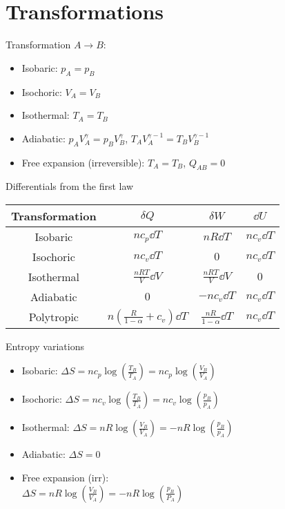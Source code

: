\documentclass{aa}
\begin{document}
\section{Transformations}
Transformation $A\to B$:
\begin{itemize}
\item Isobaric: $p_A=p_B$\\
\item Isochoric: $V_A=V_B$\\
\item Isothermal: $T_A=T_B$\\
\item Adiabatic: $p_AV_A^\gamma=p_BV_B^\gamma$, $T_AV_A^{\gamma-1}=T_BV_B^{\gamma-1}$\\
\item Free expansion (irreversible): $T_A=T_B$, $Q_{AB}=0$
\end{itemize}
Differentials from the first law
\begin{table}[H]
	\centering
	\begin{tabular}{|c|c|c|c|}
		\hline
		Transformation&$\delta Q$&$\delta W$&$\dd U$\\
		\hline
		Isobaric&$n c_p\dd T$&$nR\dd T$&$nc_v\dd T$\\
		\hline
		Isochoric&$nc_v\dd T$&$0$&$nc_v\dd T$\\
		\hline
		Isothermal&$\frac{nRT}{V}\dd V$&$\frac{nRT}{V}\dd V$&$0$\\
		\hline
		Adiabatic&$0$&$-nc_v\dd T$&$nc_v\dd T$\\
		\hline
		Polytropic&$n\left( \frac{R}{1-\alpha}+c_v \right)\dd T$&$\frac{nR}{1-\alpha}\dd T$&$nc_v\dd T$\\
		\hline
	\end{tabular}
	\label{tab:difftra}
\end{table}
Entropy variations
\begin{itemize}
\item Isobaric: $\Delta S=nc_p\log\left( \frac{T_B}{T_A} \right)=nc_p\log\left( \frac{V_B}{V_A} \right)$\\
\item Isochoric: $\Delta S=nc_v\log\left( \frac{T_B}{T_A} \right)=nc_v\log\left( \frac{p_B}{p_A} \right)$\\
\item Isothermal: $\Delta S=nR\log\left( \frac{V_B}{V_A} \right)=-nR\log\left( \frac{p_B}{p_A} \right)$\\
\item Adiabatic: $\Delta S=0$
\item Free expansion (irr):\\ $\Delta S=nR\log\left( \frac{V_B}{V_A} \right)=-nR\log\left( \frac{p_B}{P_A} \right)$
\end{itemize}
\end{document}

